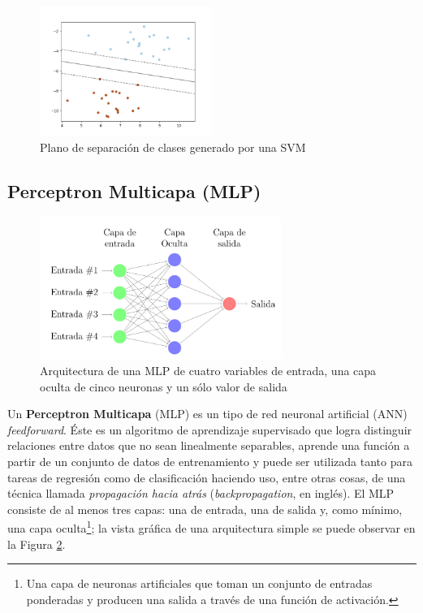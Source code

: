       \begin{figure}
      \centering%
      \includegraphics[width=0.5\textwidth]{images/svm_hiperplane}%
      \caption{Plano de separación de clases generado por una SVM}\label{fig:svm}
      \end{figure}

  \subsection{Perceptron Multicapa (MLP)}
      \begin{figure}
      \centering%
      \includegraphics[width=0.7\textwidth]{images/ejemplo_mlp}%
      \caption{Arquitectura de una MLP de cuatro variables de entrada, una capa
              oculta de cinco neuronas y un sólo valor de salida}\label{fig:mlp}
      \end{figure}

    \par Un \textbf{Perceptron Multicapa} (MLP)\cite{mlp_intro1, mlp_intro2} es un tipo
      de red neuronal artificial (ANN) \textit{feedforward}.
      Éste es un algoritmo de aprendizaje supervisado que logra distinguir
      relaciones entre datos que no sean linealmente separables, aprende una función
      a partir de un conjunto de datos de entrenamiento y puede ser
      utilizada tanto para tareas de regresión como de clasificación haciendo uso, entre
      otras cosas, de una técnica llamada \textit{propagación hacia atrás}\cite{backpropagation}
      (\textit{backpropagation}, en inglés).
      El MLP consiste de al menos tres capas: una de entrada, una de salida y,
      como mínimo, una capa oculta\footnote{Una capa de neuronas artificiales que toman un conjunto
      de entradas ponderadas y producen una salida a través de una función de activación.};
      la vista gráfica de una arquitectura simple se puede observar en la
      Figura \ref{fig:mlp}.

